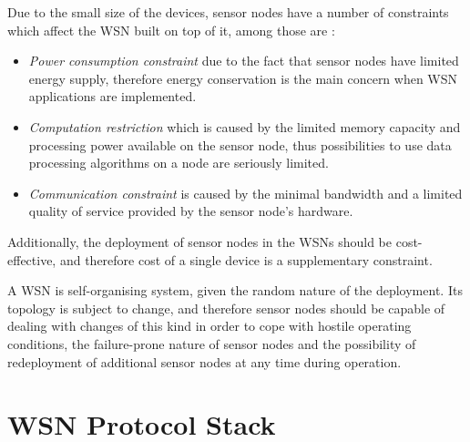 Due to the small size of the devices, sensor nodes have a number of constraints
which affect the WSN built on top of it, among those are \cite{yao:qps}:
\begin{itemize}
  \item \emph{Power consumption constraint} due to the fact that sensor nodes
  have limited energy supply, therefore energy conservation is the main concern when
  WSN applications are implemented.
  \item \emph{Computation restriction} which is caused by the limited memory
  capacity and processing power available on the sensor node, thus possibilities to
  use data processing algorithms on a node are seriously limited. 
  \item \emph{Communication constraint} is caused by the minimal bandwidth and a
  limited quality of service provided by the sensor node's hardware. 
\end{itemize}

Additionally, the deployment of sensor nodes in the WSNs should be
cost-effective, and therefore cost of a single device is a supplementary constraint.

A WSN is self-organising system, given the random nature of the deployment. Its
topology is subject to change, and therefore sensor nodes should be capable of
dealing with changes of this kind in order to cope with hostile operating
conditions, the failure-prone nature of sensor nodes and the possibility of
redeployment of additional sensor nodes at any time during operation.

\section{WSN Protocol Stack} \label{sec:WSNProtStack}

